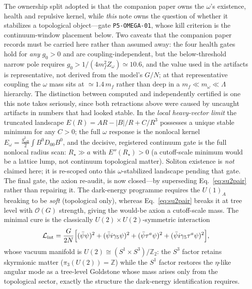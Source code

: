 \documentclass[11pt,a4paper]{article}
\begin{document}
The ownership split adopted is that the companion paper owns the
$\omega$'s existence, health and repulsive kernel, while
\emph{this} note owns the question of whether it stabilizes a
topological object---gate \texttt{P5-OMEGA-01}, whose kill
criterion is the continuum-window placement below.
Two caveats that the companion paper records must be carried here
rather than assumed away: the four health gates hold for
\emph{any} $g_0 > 0$ and are coupling-independent, but the
below-threshold narrow pole requires
$g_0 > 1/(4m_f^2 Z_\omega) \simeq 10.6$, and the value used in
the artifacts is representative, not derived from the model's
$G/N$; at that representative coupling the $\omega$ mass sits at
$\simeq 1.4\,m_f$ rather than deep in a $m_f \ll m_\omega \ll
\Lambda$ hierarchy.  The distinction between computed and
independently certified is one this note takes seriously, since
both retractions above were caused by uncaught artifacts in
numbers that had looked stable.  In the \emph{local heavy-vector limit} the truncated landscape
$E(R) = AR - |B|/R + C/R^3$ possesses a unique stable minimum for
any $C > 0$; the full $\omega$ response is the nonlocal kernel
$E_\omega = \tfrac{g_{\omega B}^2}{2}\int B^0 D_{00} B^0$, and the
decisive, registered continuum gate is the full nonlocal radius
scan: $R_\star \gg a$ with $E''(R_\star) > 0$ (a cutoff-scale
minimum would be a lattice lump, not continuum topological
matter).  Soliton existence is \emph{not} claimed here; it is
re-scoped onto this $\omega$-stabilized landscape pending that
gate.
The final gate, the axion re-audit, is now closed---by
superseding Eq.~\eqref{eq:su2pair} rather than repairing it.
The dark-energy programme requires the $U(1)_A$ breaking to be
\emph{soft} (topological only), whereas Eq.~\eqref{eq:su2pair}
breaks it at tree level with $\mathcal{O}(G)$ strength, giving
the would-be axion a cutoff-scale mass.  The minimal cure is the
classically $U(2)\times U(2)$-symmetric interaction
\begin{equation}
\mathcal{L}_{\rm int} = \frac{G}{2N}\Bigl[(\bar\psi\psi)^2
+ (\bar\psi i\gamma_5\psi)^2
+ (\bar\psi\tau^a\psi)^2
+ (\bar\psi i\gamma_5\tau^a\psi)^2\Bigr],
\label{eq:u2pair}
\end{equation}
whose vacuum manifold is $U(2) \cong (S^1\times S^3)/\mathbb{Z}_2$:
the $S^3$ factor retains skyrmionic matter
($\pi_3(U(2)) = \mathbb{Z}$) while the $S^1$ factor restores the
$\eta$-like angular mode as a tree-level Goldstone whose mass
arises only from the topological sector, exactly the structure the
dark-energy identification requires.
\end{document}
